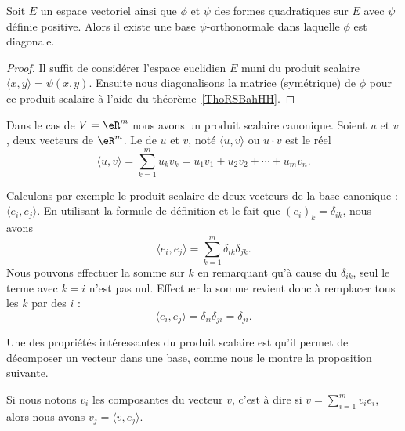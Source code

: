 \begin{corollary}   \label{CorSMHpoVK}
    Soit \( E\) un espace vectoriel ainsi que \( \phi\) et \( \psi\) des formes quadratiques sur \( E\) avec \( \psi\) définie positive. Alors il existe une base \( \psi\)-orthonormale dans laquelle \( \phi\) est diagonale.
\end{corollary}

\begin{proof}
    Il suffit de considérer l'espace euclidien \( E\) muni du produit scalaire \( \langle x, y\rangle =\psi(x,y)\). Ensuite nous diagonalisons la matrice (symétrique) de \( \phi\) pour ce produit scalaire à l'aide du théorème~\ref{ThoRSBahHH}.
\end{proof}

\begin{definition}      \label{DefYNWUFc}
    Dans le cas de \( V=\eR^m\) nous avons un produit scalaire canonique. Soient $u$ et $v$, deux vecteurs de $\eR^m$. Le  de $u$ et $v$, noté $\langle u, v\rangle $ ou $u\cdot v$ est le réel
	\begin{equation}		\label{EqDefProdScalsumii}
		\langle u, v\rangle =\sum_{k=1}^m u_kv_k=u_1v_1+u_2v_2+\cdots+u_mv_n.
	\end{equation}
\end{definition}

Calculons par exemple le produit scalaire de deux vecteurs de la base canonique : $\langle e_i, e_j\rangle $. En utilisant la formule de définition et le fait que $(e_i)_k=\delta_{ik}$, nous avons
\begin{equation}
	\langle e_i, e_j\rangle =\sum_{k=1}^m\delta_{ik}\delta_{jk}.
\end{equation}
Nous pouvons effectuer la somme sur $k$ en remarquant qu'à cause du $\delta_{ik}$, seul le terme avec $k=i$ n'est pas nul. Effectuer la somme revient donc à remplacer tous les $k$ par des $i$ :
\begin{equation}
	\langle e_i, e_j\rangle =\delta_{ii}\delta_{ji}=\delta_{ji}.
\end{equation}

Une des propriétés intéressantes du produit scalaire est qu'il permet de décomposer un vecteur dans une base, comme nous le montre la proposition suivante.

\begin{proposition}		\label{PropScalCompDec}
	Si nous notons $v_i$ les composantes du vecteur $v$, c'est à dire si $v=\sum_{i=1}^m v_ie_i$, alors nous avons $v_j=\langle v, e_j\rangle $.
\end{proposition}

